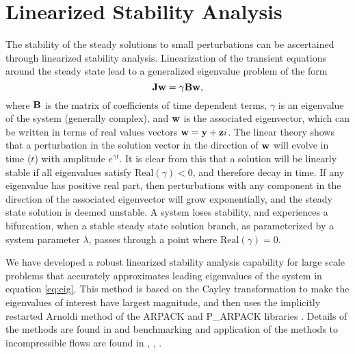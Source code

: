\section{Linearized Stability Analysis}
The stability of the steady solutions to small perturbations can be ascertained through linearized stability analysis. Linearization of the transient equations around the steady state lead to a generalized eigenvalue problem of the form
\begin{equation}
\label{eq:eig}
{\bf J} {\bf w} = \gamma {\bf B} {\bf w},
\end{equation}
where ${\bf B}$ is the matrix of coefficients of time dependent terms, $\gamma$ is an eigenvalue of the system (generally complex), and ${\bf w}$ is the associated eigenvector, which can be written in terms of real values vectors ${\bf w} = {\bf y} + {\bf z} i$. The linear theory shows that a perturbation in the solution vector in the direction of ${\bf w}$ will evolve in time ($t$) with amplitude $e^{\gamma t}$. It is clear from this that a solution will be linearly stable if all eigenvalues satisfy $\mbox{Real}(\gamma) < 0$, and therefore decay in time. If any eigenvalue has positive real part, then perturbations with any component in the direction of the associated eigenvector will grow exponentially, and the steady state solution is deemed unstable. A system loses stability, and experiences a bifurcation, when a stable steady state solution branch, as parameterized by a system parameter $\lambda$, passes through a point where $\mbox{Real}(\gamma)=0$. 

We have developed a robust linearized stability analysis capability for large scale problems that accurately approximates leading eigenvalues of the system in equation \ref{eq:eig}. This method is based on the Cayley transformation to make the eigenvalues of interest have largest magnitude, and then uses the implicitly restarted Arnoldi method of the ARPACK and P\_ARPACK libraries \cite{lehoucq98b, maschhoff96}. Details of the methods are found in \cite{lehoucq01} and benchmarking and application of the methods to incompressible flows are found in \cite{Burroughs01}, \cite{lehoucq98}, \cite{salinger99a}.
